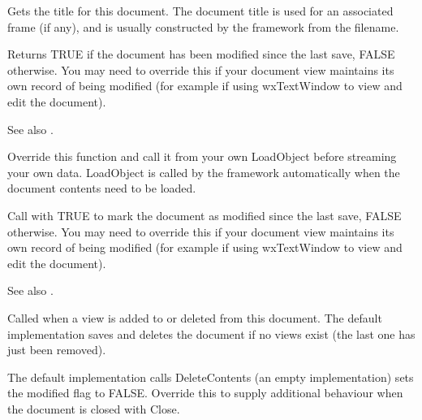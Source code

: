 
Gets the title for this document. The document title is used for an associated
frame (if any), and is usually constructed by the framework from
the filename.

\label{wxdocumentismodified}


Returns TRUE if the document has been modified since the last save, FALSE otherwise.
You may need to override this if your document view maintains its own
record of being modified (for example if using wxTextWindow to view and edit the document).

See also .



Override this function and call it from your own LoadObject before
streaming your own data. LoadObject is called by the framework
automatically when the document contents need to be loaded.

\label{wxdocumentmodify}


Call with TRUE to mark the document as modified since the last save, FALSE otherwise.
You may need to override this if your document view maintains its own
record of being modified (for example if using wxTextWindow to view and edit the document).

See also .



Called when a view is added to or deleted from this document. The default
implementation saves and deletes the document if no views exist (the last
one has just been removed).



The default implementation calls DeleteContents (an empty implementation)
sets the modified flag to FALSE. Override this to
supply additional behaviour when the document is closed with Close.


